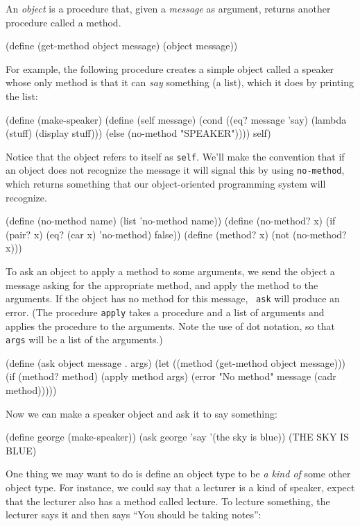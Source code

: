 An {\it  object}  is a procedure that, given a {\it message}  as
argument, returns another procedure called a method.  

\beginlisp
(define (get-method object message)
  (object message))
\endlisp

For example, the following procedure creates a simple object called a
speaker whose only method is that it can {\it  say} something (a list), 
which it does by printing the list:  

\beginlisp
(define (make-speaker)
  (define (self message)
    (cond ((eq? message 'say)
           (lambda (stuff) (display stuff)))
          (else (no-method "SPEAKER"))))
  self)
\endlisp
        
Notice that the object refers to itself as {\tt self}. We'll  make the
convention that if an object does not recognize the message it will
signal this by using {\tt  no-method}, which returns something that our
object-oriented programming system will recognize.  

\beginlisp                                              
(define (no-method name)
  (list 'no-method name))
\null
(define (no-method? x)
  (if (pair? x)
      (eq? (car x) 'no-method)
      false))
\null
(define (method? x)
  (not (no-method? x)))
\endlisp


To ask  an object to apply a method to some arguments, we send the
object a message asking for the appropriate method, and apply the method
to the arguments.  If the object has no method for this message,  {\tt
ask} will produce an error.  (The procedure {\tt apply} takes a
procedure and a list of arguments and applies the procedure to the
arguments.  Note the use of dot notation, so  that {\tt args} will be a list
of the arguments.)   

\beginlisp
(define (ask object message . args)
  (let ((method (get-method object message)))
    (if (method? method)
        (apply method args)
        (error "No method" message (cadr method)))))
\endlisp

Now we can make a speaker object and ask it to say something:

\beginlisp
(define george (make-speaker))
(ask george 'say '(the sky is blue))
(THE SKY IS BLUE)
\endlisp

One thing we may want to do is define an object type to be {\it a kind
of} some other object type.  For instance, we could say that a lecturer
is a kind of speaker, expect that the lecturer also has a method called
lecture.  To lecture something, the lecturer says it and then says ``You
should be taking notes'':   

